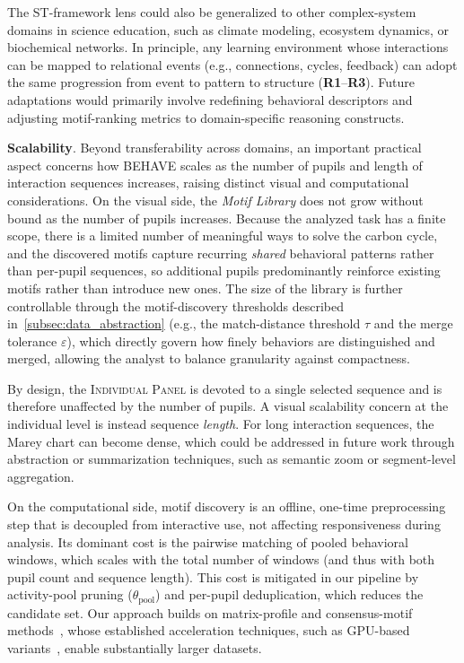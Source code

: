 \documentclass[letterpaper,journal]{IEEEtran}
\begin{document}
The ST-framework lens could also be generalized to other complex-system domains in science education, such as climate modeling, ecosystem dynamics, or biochemical networks. 
In principle, any learning environment whose interactions can be mapped to relational events (e.g., connections, cycles, feedback) can adopt the same progression from event to pattern to structure (\textbf{R1}--\textbf{R3}). 
Future adaptations would primarily involve redefining behavioral descriptors and adjusting motif-ranking metrics to domain-specific reasoning constructs.

\noindent
\textbf{Scalability}.
Beyond transferability across domains, an important practical aspect concerns how \textsc{BEHAVE} scales as the number of pupils and length of interaction sequences increases, raising distinct visual and computational considerations.
On the visual side, the \textit{Motif Library} does not grow without bound as the number of pupils increases.
Because the analyzed task has a finite scope, there is a limited number of meaningful ways to solve the carbon cycle, and the discovered motifs capture recurring \textit{shared} behavioral patterns rather than per-pupil sequences, so additional pupils predominantly reinforce existing motifs rather than introduce new ones.
The size of the library is further controllable through the motif-discovery thresholds described in~\cref{subsec:data_abstraction} (e.g., the match-distance threshold $\tau$ and the merge tolerance $\varepsilon$), which directly govern how finely behaviors are distinguished and merged, allowing the analyst to balance granularity against compactness.

By design, the \textsc{Individual Panel} is devoted to a single selected sequence and is therefore unaffected by the number of pupils.
A visual scalability concern at the individual level is instead sequence \textit{length}.
For long interaction sequences, the Marey chart can become dense, which could be addressed in future work through abstraction or summarization techniques, such as semantic zoom or segment-level aggregation.

On the computational side, motif discovery is an offline, one-time preprocessing step that is decoupled from interactive use,  not affecting responsiveness during analysis.
Its dominant cost is the pairwise matching of pooled behavioral windows, which scales with the total number of windows (and thus with both pupil count and sequence length).
This cost is mitigated in our pipeline by activity-pool pruning ($\theta_{\mathrm{pool}}$) and per-pupil deduplication, which reduces the candidate set.
Our approach builds on matrix-profile and consensus-motif methods~\cite{kamgar2019matrix, yeh2017matrix}, whose established acceleration techniques, such as GPU-based variants~\cite{zhu2016matrix}, enable substantially larger datasets.
\end{document}
